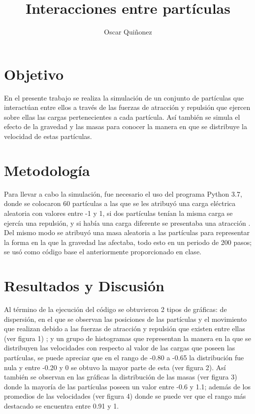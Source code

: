 \documentclass{article}
\title {Interacciones entre part\'iculas}
\author{Oscar Qui\~nonez}
\begin{document}
\maketitle
 
\section{Objetivo}\label{met}

En el presente trabajo se realiza la simulaci\'on de un conjunto de part\'iculas que interact\'uan entre ellos a trav\'es de las fuerzas de atracci\'on y repulsi\'on que ejercen sobre ellas las cargas pertenecientes a cada part\'icula. As\'i tambi\'en se simula el efecto de la gravedad y las masas para conocer la manera en que se distribuye la velocidad de estas part\'iculas. 

\section{Metodolog\'ia}\label{met}

Para llevar a cabo la simulaci\'on, fue necesario el uso del programa Python 3.7, donde se colocaron 60 part\'iculas a las que se les atribuy\'o una carga el\'ectrica aleatoria con valores entre -1 y 1, si dos part\'iculas ten\'ian la misma carga se ejerc\'ia una repulsi\'on, y si hab\'ia una carga diferente se presentaba una atracci\'on \cite{satuelisa}. Del mismo modo se atribuy\'o una masa aleatoria a las part\'iculas para representar la forma en la que la gravedad las afectaba, todo esto en un periodo de 200 pasos; se us\'o como c\'odigo base \cite{doctora} el anteriormente proporcionado en clase.

\section{Resultados y Discusi\'on}\label{res}

Al t\'ermino de la ejecuci\'on del c\'odigo se obtuvieron 2 tipos de gr\'aficas: de dispersi\'on, en el que se observan las posiciones de las part\'iculas y el movimiento que realizan debido a las fuerzas de atracci\'on y repulsi\'on que existen entre ellas (ver figura 1) ; y un grupo de histogramas que representan la manera en la que se distribuyen las velocidades con respecto al valor de las cargas que poseen las part\'iculas, se puede apreciar que en el rango de -0.80 a -0.65 la distribuci\'on fue nula y entre -0.20 y 0 se obtuvo la mayor parte de esta (ver figura 2). As\'i tambi\'en se observan en las gr\'aficas la distribuci\'on de las masas (ver figura 3) donde la mayor\'ia de las part\'iculas poseen un valor entre -0.6 y 1.1; adem\'as de los promedios de las velocidades (ver figura 4) donde se puede ver que el rango m\'as destacado se encuentra entre 0.91 y 1.
\end{document}
